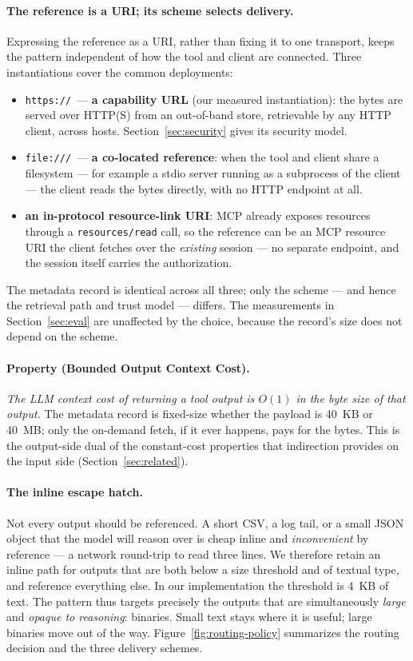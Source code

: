 \documentclass[11pt]{article}
\newcommand{\bref}{by reference}
\begin{document}
\paragraph{The reference is a URI; its scheme selects delivery.} Expressing the reference as a URI, rather than fixing it to one transport, keeps the pattern independent of how the tool and client are connected. Three instantiations cover the common deployments:
\begin{itemize}
\item \texttt{https://}~--- \textbf{a capability URL} (our measured instantiation): the bytes are served over HTTP(S) from an out-of-band store, retrievable by any HTTP client, across hosts. Section~\ref{sec:security} gives its security model.
\item \texttt{file:///}~--- \textbf{a co-located reference}: when the tool and client share a filesystem --- for example a stdio server running as a subprocess of the client --- the client reads the bytes directly, with no HTTP endpoint at all.
\item \textbf{an in-protocol resource-link URI}: MCP already exposes resources through a \texttt{resources/read} call, so the reference can be an MCP resource URI the client fetches over the \emph{existing} session --- no separate endpoint, and the session itself carries the authorization.
\end{itemize}
The metadata record is identical across all three; only the scheme --- and hence the retrieval path and trust model --- differs. The measurements in Section~\ref{sec:eval} are unaffected by the choice, because the record's size does not depend on the scheme.

\paragraph{Property (Bounded Output Context Cost).} \emph{The LLM context cost of returning a tool output is $O(1)$ in the byte size of that output.} The metadata record is fixed-size whether the payload is 40~KB or 40~MB; only the on-demand fetch, if it ever happens, pays for the bytes. This is the output-side dual of the constant-cost properties that indirection provides on the input side (Section~\ref{sec:related}).

\paragraph{The inline escape hatch.} Not every output should be referenced. A short CSV, a log tail, or a small JSON object that the model will reason over is cheap inline and \emph{inconvenient} \bref{} --- a network round-trip to read three lines. We therefore retain an inline path for outputs that are both below a size threshold and of textual type, and reference everything else. In our implementation the threshold is 4~KB of text. The pattern thus targets precisely the outputs that are simultaneously \emph{large} and \emph{opaque to reasoning}: binaries. Small text stays where it is useful; large binaries move out of the way. Figure~\ref{fig:routing-policy} summarizes the routing decision and the three delivery schemes.
\end{document}
